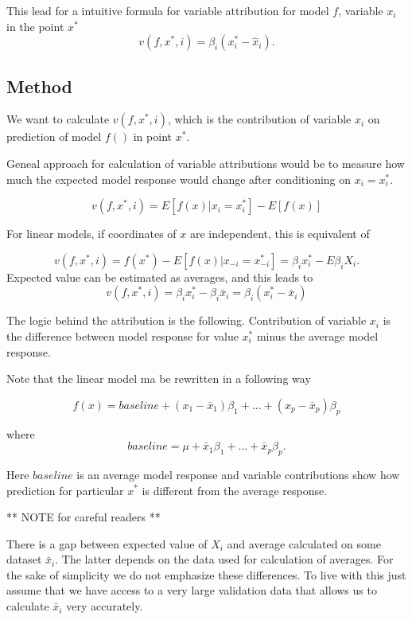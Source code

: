 \documentclass[]{krantz}
\theoremstyle{definition}
\theoremstyle{definition}
\theoremstyle{definition}
\theoremstyle{remark}
\begin{document}
This lead for a intuitive formula for variable attribution for model
\(f\), variable \(x_i\) in the point \(x^*\) \[
v(f, x^*, i) = \beta_i (x_i^* - \hat x_i).
\]

\hypertarget{method}{%
\subsection{Method}\label{method}}

We want to calculate \(v(f, x^*, i)\), which is the contribution of
variable \(x_i\) on prediction of model \(f()\) in point \(x^*\).

Geneal approach for calculation of variable attributions would be to
measure how much the expected model response would change after
conditioning on \(x_i = x_i^*\).

\[
v(f, x^*, i) = E[f(x) | x_i = x_i^*] - E[f(x)]
\]

For linear models, if coordinates of \(x\) are independent, this is
equivalent of

\[
v(f, x^*, i) = f(x^*) - E[f(x)|x_{-i} = x^*_{-i}] = \beta_i x^*_i  - E \beta_i X_i.
\] Expected value can be estimated as averages, and this leads to\\
\[
v(f, x^*, i) = \beta_i x^*_i - \beta_i \bar x_i = \beta_i (x^*_i - \bar x_i)
\]

The logic behind the attribution is the following. Contribution of
variable \(x_i\) is the difference between model response for value
\(x_i^*\) minus the average model response.

Note that the linear model ma be rewritten in a following way

\[
f(x) = baseline + (x_1 - \bar x_1) \beta_1 + ... + (x_p - \bar x_p) \beta_p
\]

where \[
baseline = \mu + \bar x_1 \beta_1 + ... + \bar x_p \beta_p.
\]

Here \(baseline\) is an average model response and variable
contributions show how prediction for particular \(x^*\) is different
from the average response.

** NOTE for careful readers **

There is a gap between expected value of \(X_i\) and average calculated
on some dataset \(\bar x_i\). The latter depends on the data used for
calculation of averages. For the sake of simplicity we do not emphasize
these differences. To live with this just assume that we have access to
a very large validation data that allows us to calculate \(\bar x_i\)
very accurately.
\end{document}
